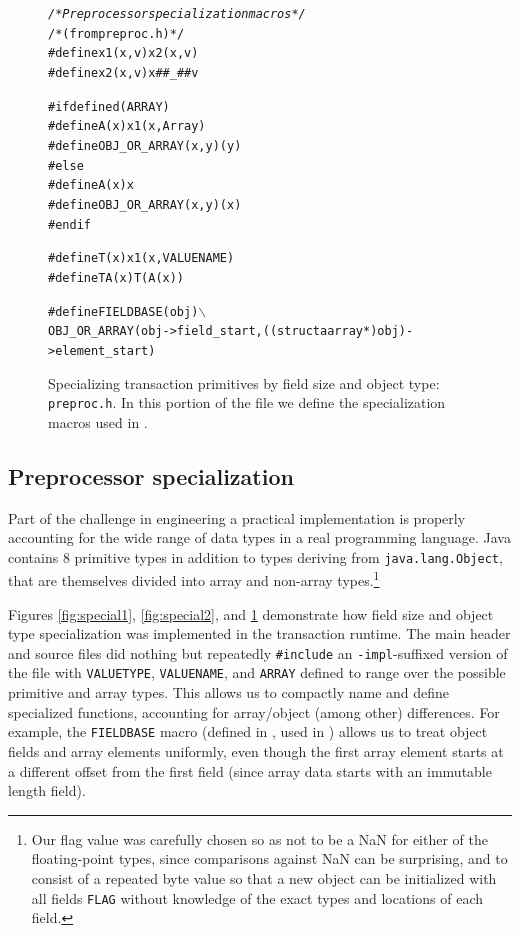 \begin{figure}\sis\fontsize{8}{9}\begin{alltt}
\textit{/* Preprocessor specialization macros */}
/* (from preproc.h) */
#define x1(x,v) x2(x,v)
#define x2(x,v) x ## _ ## v

#if defined(ARRAY)
# define A(x) x1(x,Array)
# define OBJ_OR_ARRAY(x,y) (y)
#else
# define A(x) x
# define OBJ_OR_ARRAY(x,y) (x)
#endif

#define T(x) x1(x,VALUENAME)
#define TA(x) T(A(x))

#define FIELDBASE(obj) \(\backslash\)
         OBJ_OR_ARRAY(obj->field_start,((struct aarray *)obj)->element_start)
\end{alltt}
\caption[Specializing transaction primitives by field size and object
 type (\texttt{preproc.h}).]
{Specializing transaction primitives by field size and object
 type: \texttt{preproc.h}.  In this portion of the file we define the
 specialization macros used in .}
\label{fig:special3}
\end{figure}

\subsection{Preprocessor specialization}
Part of the challenge in engineering a practical implementation is
properly accounting for the wide range of data types in a real
programming language.  Java contains 8 primitive types in addition to
types deriving from \texttt{java.lang.Object},
that are themselves divided into array and non-array
types.\footnote{Our flag value was carefully chosen so as not to be a NaN for either
of the floating-point types, since comparisons against NaN can be
surprising, and to consist of a repeated byte value so that a new
object can be initialized with all fields \texttt{FLAG} without
knowledge of the exact types and locations of each field.}

Figures \ref{fig:special1}, \ref{fig:special2}, and \ref{fig:special3}
demonstrate how
field size and object type specialization was implemented in the \flex
transaction runtime.  The main header and source files did nothing but
repeatedly \texttt{\#include} an \texttt{-impl}-suffixed version of
the file with \texttt{VALUETYPE}, \texttt{VALUENAME}, and
\texttt{ARRAY} defined to range over the possible primitive and array
types.  This allows us to compactly name and define specialized
functions, accounting for array/object (among other) differences.  For
example, the \texttt{FIELDBASE} macro (defined in ,
used in ) allows us to treat object fields
and array elements uniformly, even though the first array element
starts at a different offset from the first field (since array data starts with
an immutable length field).

